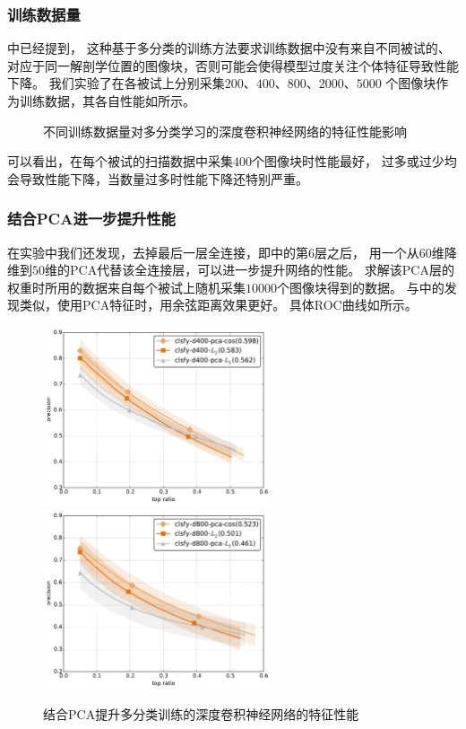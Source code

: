 \subsubsection{训练数据量}
中已经提到，
这种基于多分类的训练方法要求训练数据中没有来自不同被试的、
对应于同一解剖学位置的图像块，否则可能会使得模型过度关注个体特征导致性能下降。
我们实验了在各被试上分别采集$200$、$400$、$800$、$2000$、$5000$
个图像块作为训练数据，其各自性能如所示。
\begin{figure}[H]
    \caption{不同训练数据量对多分类学习的深度卷积神经网络的特征性能影响}
    \label{fig:expr:curve:clsfy:datasize}
\end{figure}

可以看出，在每个被试的扫描数据中采集$400$个图像块时性能最好，
过多或过少均会导致性能下降，当数量过多时性能下降还特别严重。

\subsubsection{结合PCA进一步提升性能\label{sec:expr:clsfy:pca}}
在实验中我们还发现，去掉最后一层全连接，即中的第6层之后，
用一个从$60$维降维到$50$维的PCA代替该全连接层，可以进一步提升网络的性能。
求解该PCA层的权重时所用的数据来自每个被试上随机采集$10000$个图像块得到的数据。
与中的发现类似，使用PCA特征时，用余弦距离效果更好。
具体ROC曲线如所示。

\begin{figure}[H]
    \centering
    \includegraphics[width=0.6\textwidth]{res/expr/clsfy/pca/0.pdf}
    \includegraphics[width=0.6\textwidth]{res/expr/clsfy/pca/1.pdf}
    \caption{结合PCA提升多分类训练的深度卷积神经网络的特征性能}
    \label{fig:expr:curve:clsfy:pca}
\end{figure}


